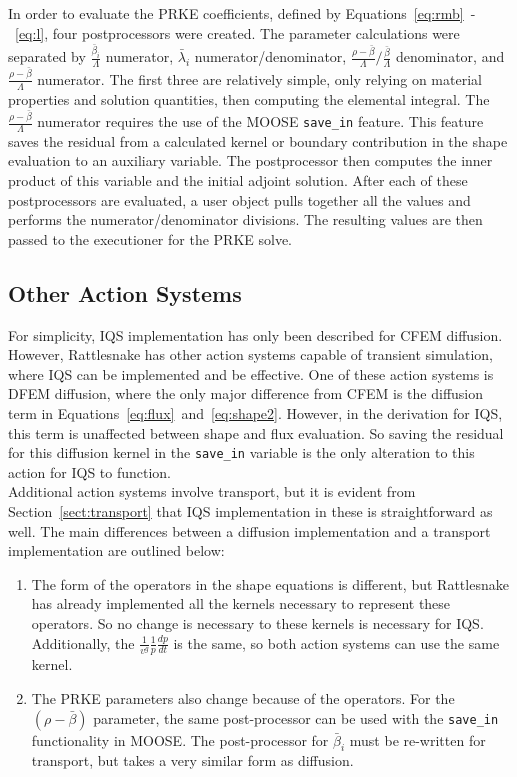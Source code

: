 \documentclass[12pt]{scrartcl}
\newcommand{\rattlesnake}{Rattlesnake }
\newcommand{\sct}[1]{Section~\ref{#1}}                   %
\begin{document}
In order to evaluate the PRKE coefficients, defined by Equations~\ref{eq:rmb}~-~\ref{eq:l}, four postprocessors were created.  The parameter calculations were separated by $\frac{\bar{\beta}_i}{\Lambda}$ numerator, $\bar{\lambda}_i$ numerator/denominator, $\frac{\rho-\bar{\beta}}{\Lambda}/\frac{\bar{\beta}}{\Lambda}$ denominator, and $\frac{\rho-\bar{\beta}}{\Lambda}$ numerator. The first three are relatively simple, only relying on material properties and solution quantities, then computing the elemental integral.  The $\frac{\rho-\bar{\beta}}{\Lambda}$ numerator requires the use of the MOOSE \texttt{save\_in} feature. This feature saves the residual from a calculated kernel or boundary contribution in the shape evaluation to an auxiliary variable.  The postprocessor then computes the inner product of this variable and the initial adjoint solution.  After each of these postprocessors are evaluated, a user object pulls together all the values and performs the numerator/denominator divisions.  The resulting values are then passed to the executioner for the PRKE solve.

\subsection{Other Action Systems}

For simplicity, IQS implementation has only been described for CFEM diffusion.  However, \rattlesnake has other action systems capable of transient simulation, where IQS can be implemented and be effective.  One of these action systems is DFEM diffusion, where the only major difference from CFEM is the diffusion term in Equations~\ref{eq:flux}~and~\ref{eq:shape2}.  However, in the derivation for IQS, this term is unaffected between shape and flux evaluation.  So saving the residual for this diffusion kernel in the \texttt{save\_in} variable is the only alteration to this action for IQS to function.\\

Additional action systems involve transport, but it is evident from \sct{sect:transport} that IQS implementation in these is straightforward as well.  The main differences between a diffusion implementation and a transport implementation are outlined below:
\begin{enumerate}
\item The form of the operators in the shape equations is different, but \rattlesnake has already implemented all the kernels necessary to represent these operators.  So no change is necessary to these kernels is necessary for IQS.  Additionally, the $\frac{1}{v^g}\frac{1}{p}\frac{dp}{dt}$ is the same, so both action systems can use the same kernel.
\item The PRKE parameters also change because of the operators.  For the $(\rho-\bar{\beta})$ parameter, the same post-processor can be used with the \texttt{save\_in} functionality in MOOSE.  The post-processor for $\bar{\beta}_i$ must be re-written for transport, but takes a very similar form as diffusion.
\end{enumerate}
\end{document}
